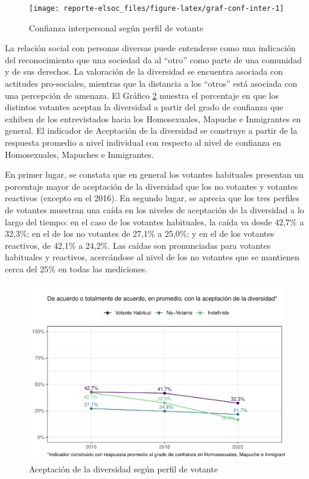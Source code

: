 \documentclass[
  12pt,
]{book}
\begin{document}
\begin{figure}

{\centering \texttt{[image: reporte-elsoc\_files/figure-latex/graf-conf-inter-1]} 

}

\caption{Confianza interpersonal según perfil de votante}\label{fig:graf-conf-inter}
\end{figure}

La relación social con personas diversas puede entenderse como una indicación del reconocimiento que una sociedad da al ``otro'' como parte de una comunidad y de sus derechos. La valoración de la diversidad se encuentra asociada con actitudes pro-sociales, mientras que la distancia a los ``otros'' está asociada con una percepción de amenaza. El Gráfico \ref{fig:indice-diversidad-part} muestra el porcentaje en que los distintos votantes aceptan la diversidad a partir del grado de confianza que exhiben de los entrevistados hacia los Homosexuales, Mapuche e Inmigrantes en general. El indicador de Aceptación de la diversidad se construye a partir de la respuesta promedio a nivel individual con respecto al nivel de confianza en Homosexuales, Mapuches e Inmigrantes.

En primer lugar, se constata que en general los votantes habituales presentan un porcentaje mayor de aceptación de la diversidad que los no votantes y votantes reactivos (excepto en el 2016). En segundo lugar, se aprecia que los tres perfiles de votantes muestran una caída en los niveles de aceptación de la diversidad a lo largo del tiempo: en el caso de los votantes habituales, la caída va desde 42,7\% a 32,3\%; en el de los no votantes de 27,1\% a 25,0\%; y en el de los votantes reactivos, de 42,1\% a 24,2\%. Las caídas son pronunciadas para votantes habituales y reactivos, acercándose al nivel de los no votantes que se mantienen cerca del 25\% en todas las mediciones.

\begin{figure}

{\centering \includegraphics{reporte-elsoc_files/figure-latex/indice-diversidad-part-1} 

}

\caption{Aceptación de la diversidad según perfil de votante}\label{fig:indice-diversidad-part}
\end{figure}
\end{document}
